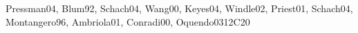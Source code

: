 \begin{syllabus}
\begin{unit}{\SESoftwareVerificationandValidation}{}{Pressman04, Blum92, Schach04, Wang00, Keyes04, Windle02, Priest01, Schach04, Montangero96, Ambriola01, Conradi00, Oquendo03}{12}{C20}
\begin{topics}%
    \item \SESoftwareVerificationandValidationTopicVerification
    \item \SESoftwareVerificationandValidationTopicInspections
    \item \SESoftwareVerificationandValidationTopicTesting
    \item \SESoftwareVerificationandValidationTopicTestingFundamentals
    \item \SESoftwareVerificationandValidationTopicDefect
    \item \SESoftwareVerificationandValidationTopicLimitations
    \item \SESoftwareVerificationandValidationTopicStatic
    \item \SESoftwareVerificationandValidationTopicTest
    \item \SESoftwareVerificationandValidationTopicValidation
    \item \SESoftwareVerificationandValidationTopicObject
    \item \SESoftwareVerificationandValidationTopicVerificationAnd
    \item \SESoftwareVerificationandValidationTopicFault
    \item \SESoftwareVerificationandValidationTopicFaultEstimation
\end{topics}
\begin{learningoutcomes}
    \item \SESoftwareVerificationandValidationLODistinguishBetween[\Usage]
    \item \SESoftwareVerificationandValidationLODescribeTheTools[\Usage]
    \item \SESoftwareVerificationandValidationLOUndertake[\Usage]
    \item \SESoftwareVerificationandValidationLODescribeAnd[\Usage]
    \item \SESoftwareVerificationandValidationLODescribeTechniquesSignificant[\Usage]
    \item \SESoftwareVerificationandValidationLOCreateAndSet[\Usage]
    \item \SESoftwareVerificationandValidationLODescribeHowGood[\Usage]
    \item \SESoftwareVerificationandValidationLOUseAToolSoftware[\Usage]

\end{learningoutcomes}
\end{unit}
\end{syllabus}
